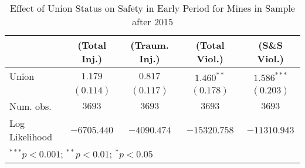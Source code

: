 
\begin{table}
\begin{center}
\begin{tabular}{l c c c c}
\hline
 & (Total Inj.) & (Traum. Inj.) & (Total Viol.) & (S\&S Viol.) \\
\hline
Union          & $1.179$     & $0.817$     & $1.460^{**}$ & $1.586^{***}$ \\
               & $(0.114)$   & $(0.117)$   & $(0.178)$    & $(0.203)$     \\
\hline
Num. obs.      & $3693$      & $3693$      & $3693$       & $3693$        \\
Log Likelihood & $-6705.440$ & $-4090.474$ & $-15320.758$ & $-11310.943$  \\
\hline
\multicolumn{5}{l}{\scriptsize{$^{***}p<0.001$; $^{**}p<0.01$; $^{*}p<0.05$}}
\end{tabular}
\caption{Effect of Union Status on Safety in Early Period for Mines in Sample after 2015}
\label{irr_100employees_activelate}
\end{center}
\end{table}

